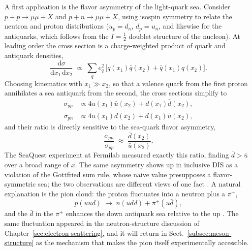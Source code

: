 A first application is the flavor asymmetry of the light-quark sea. Consider
$p+p\to\mu\mu+X$ and $p+n\to\mu\mu+X$, using isospin symmetry to relate the neutron and
proton distributions ($u_{p}=d_{n}$, $d_{p}=u_{n}$, and likewise for the antiquarks,
which follows from the $I=\tfrac{1}{2}$ doublet structure of the nucleon). At leading
order the cross section is a charge-weighted product of quark and antiquark densities,
\begin{equation}
    \frac{\mathrm{d}\sigma}{\mathrm{d}x_{1}\,\mathrm{d}x_{2}}
    \;\propto\; \sum_{q} e_{q}^{2}\,
    \bigl[q(x_{1})\bar q(x_{2}) + \bar q(x_{1})q(x_{2})\bigr].
    \label{eq:dy-xsec}
\end{equation}
Choosing kinematics with $x_{1}\gg x_{2}$, so that a valence quark from the first proton
annihilates a sea antiquark from the second, the cross sections simplify to
\begin{align}
    \sigma_{pp} &\propto 4u(x_{1})\bar u(x_{2}) + d(x_{1})\bar d(x_{2}),
    \label{eq:sigma-pp}\\
    \sigma_{pn} &\propto 4u(x_{1})\bar d(x_{2}) + d(x_{1})\bar u(x_{2}),
    \label{eq:sigma-pn}
\end{align}
and their ratio is directly sensitive to the sea-quark flavor asymmetry,
\begin{equation}
    \frac{\sigma_{pn}}{\sigma_{pp}} \;\approx\; \frac{\bar d(x_{2})}{\bar u(x_{2})}.
    \label{eq:dbar-ubar}
\end{equation}
The SeaQuest experiment at Fermilab measured exactly this ratio, finding $\bar d>\bar u$
over a broad range of $x$. The same asymmetry shows up in inclusive DIS as a violation of
the Gottfried sum rule, whose naive value presupposes a flavor-symmetric sea; the two
observations are different views of one fact \cite[Ch.~4.4]{ThomasWeise2001}. A natural
explanation is the pion cloud: the proton fluctuates
into a neutron plus a $\pi^{+}$,
\begin{equation}
    p(uud) \;\rightarrow\; n(udd) + \pi^{+}(u\bar d),
    \label{eq:pion-cloud-fluctuation}
\end{equation}
and the $\bar d$ in the $\pi^{+}$ enhances the down antiquark sea relative to the up
\cite[Ch.~7]{ThomasWeise2001}. The
same fluctuation appeared in the neutron-structure discussion of
Chapter~\ref{sec:electron-scattering}, and it will return in
Sect.~\ref{subsec:meson-structure} as the mechanism that makes the pion itself
experimentally accessible.

